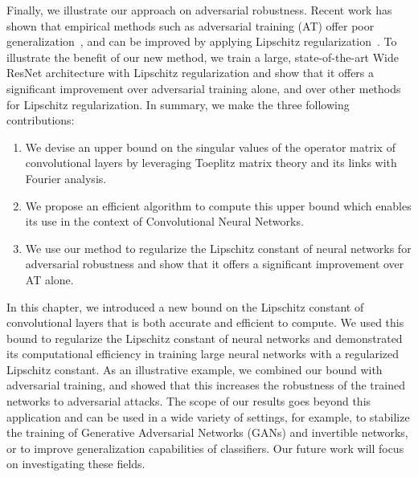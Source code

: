 {Finally, we illustrate our approach on adversarial robustness.
Recent work has shown that empirical methods such as adversarial training (AT) offer poor generalization~\cite{schmidt2018adversarially}, and can be improved by applying Lipschitz regularization~\cite{farnia2018generalizable}.
To illustrate the benefit of our new method, we train a large, state-of-the-art Wide ResNet architecture with Lipschitz regularization and show that it offers a significant improvement over adversarial training alone, and over other methods for Lipschitz regularization.
In summary, we make the three following contributions:
\begin{enumerate}
  \item We devise an upper bound on the singular values of the operator matrix of convolutional layers by leveraging Toeplitz matrix theory and its links with Fourier analysis.
  \item We propose an efficient algorithm to compute this upper bound which enables its use in the context of Convolutional Neural Networks.
  \item We use our method to regularize the Lipschitz constant of neural networks for adversarial robustness and show that it offers a significant improvement over AT alone.
\end{enumerate}


In this chapter, we introduced a new bound on the Lipschitz constant of convolutional layers that is both accurate and efficient to compute.
We used this bound to regularize the Lipschitz constant of neural networks and demonstrated its computational efficiency in training large neural networks with a regularized Lipschitz constant.
As an illustrative example, we combined our bound with adversarial training, and showed that this increases the robustness of the trained networks to  adversarial attacks.
The scope of our results goes beyond this application and can be used in a wide variety of settings, for example, to stabilize the training of Generative Adversarial Networks (GANs) and invertible networks, or to improve generalization capabilities of classifiers.
Our future work will focus on investigating these fields.


}
